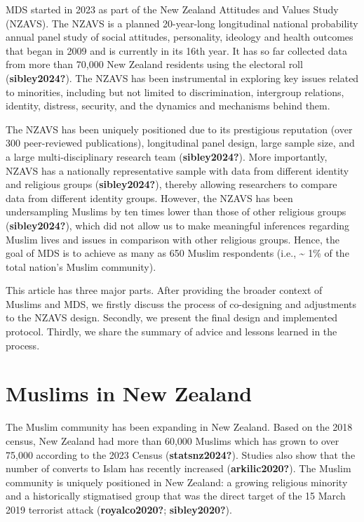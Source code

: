 \documentclass[
]{interact}
\begin{document}
MDS started in 2023 as part of the New Zealand Attitudes and Values
Study (NZAVS). The NZAVS is a planned 20-year-long longitudinal national
probability annual panel study of social attitudes, personality,
ideology and health outcomes that began in 2009 and is currently in its
16th year. It has so far collected data from more than 70,000 New
Zealand residents using the electoral roll (\textbf{sibley2024?}). The
NZAVS has been instrumental in exploring key issues related to
minorities, including but not limited to discrimination, intergroup
relations, identity, distress, security, and the dynamics and mechanisms
behind them.

The NZAVS has been uniquely positioned due to its prestigious reputation
(over 300 peer-reviewed publications), longitudinal panel design, large
sample size, and a large multi-disciplinary research team
(\textbf{sibley2024?}). More importantly, NZAVS has a nationally
representative sample with data from different identity and religious
groups (\textbf{sibley2024?}), thereby allowing researchers to compare
data from different identity groups. However, the NZAVS has been
undersampling Muslims by ten times lower than those of other religious
groups (\textbf{sibley2024?}), which did not allow us to make meaningful
inferences regarding Muslim lives and issues in comparison with other
religious groups. Hence, the goal of MDS is to achieve as many as 650
Muslim respondents (i.e., \textasciitilde{} 1\% of the total nation's
Muslim community).

This article has three major parts. After providing the broader context
of Muslims and MDS, we firstly discuss the process of co-designing and
adjustments to the NZAVS design. Secondly, we present the final design
and implemented protocol. Thirdly, we share the summary of advice and
lessons learned in the process.

\section{Muslims in New Zealand}\label{muslims-in-new-zealand}

The Muslim community has been expanding in New Zealand. Based on the
2018 census, New Zealand had more than 60,000 Muslims which has grown to
over 75,000 according to the 2023 Census (\textbf{statsnz2024?}).
Studies also show that the number of converts to Islam has recently
increased (\textbf{arkilic2020?}). The Muslim community is uniquely
positioned in New Zealand: a growing religious minority and a
historically stigmatised group that was the direct target of the 15
March 2019 terrorist attack (\textbf{royalco2020?};
\textbf{sibley2020?}).
\end{document}
